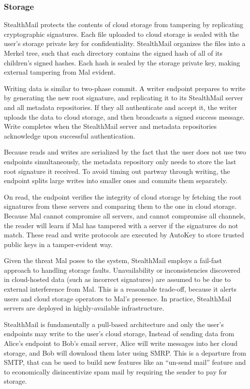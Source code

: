 \subsubsection{Storage}
StealthMail protects the contents of cloud storage from tampering by replicating cryptographic signatures.  Each file uploaded to cloud storage is sealed with the user's storage private key for confidentiality.  StealthMail organizes the files into a Merkel tree, such that each directory contains the signed hash of all of its children's signed hashes.  Each hash is sealed by the storage private key, making external tampering from Mal evident.

Writing data is similar to two-phase commit.  A writer endpoint prepares to write by generating the new root signature, and replicating it to its StealthMail server and all metadata repositories.  If they all authenticate and accept it, the writer uploads the data to cloud storage, and then broadcasts a signed success message.  Write completes when the StealthMail server and metadata repositories acknowledge upon successful authentication.

Because reads and writes are serialized by the fact that the user does not use two endpoints simultaneously, the metadata repository only needs to store the last root signature it received.  To avoid timing out partway through writing, the endpoint splits large writes into smaller ones and commits them separately.

On read, the endpoint verifies the integrity of cloud storage by fetching the root signatures from these servers and comparing them to the one in cloud storage.  Because Mal cannot compromise all servers, and cannot compromise all channels, the reader will learn if Mal has tampered with a server if the signatures do not match.  These read and write protocols are executed by AutoKey to store trusted public keys in a tamper-evident way.

Given the threat Mal poses to the system, StealthMail employs a fail-fast approach to handling storage faults.  Unavailability or inconsistencies discovered in cloud-hosted data (such as incorrect signatures) are assumed to be due to external interference from Mal.  This is a reasonable trade-off, because it alerts users and cloud storage operators to Mal's presence.  In practice, StealthMail servers are deployed in highly-available infrastructure.

StealthMail is fundamentally a pull-based architecture and only the user's endpoints may write to the user's cloud storage,   Instead of sending data from Alice's endpoint to Bob's email server, Alice will write messages into her cloud storage, and Bob will download them later using SMRP.  This is a departure from SMTP, that can be used to build new features like an ``un-send mail'' feature and to economically disincentivize spam mail by requiring the sender to pay for storage.

